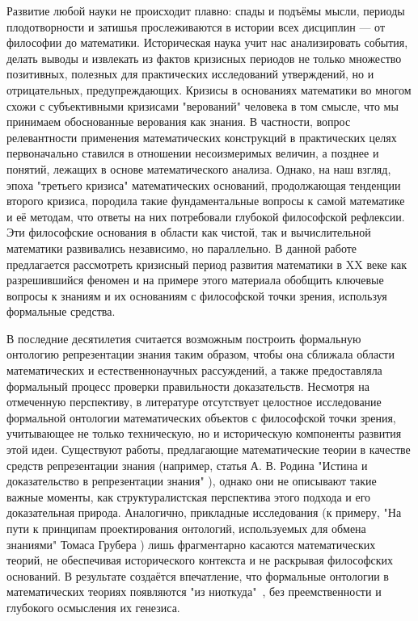 Развитие любой науки не происходит плавно: спады и подъёмы мысли, периоды плодотворности и затишья прослеживаются в истории всех дисциплин — от философии до математики. Историческая наука учит нас анализировать события, делать выводы и извлекать из фактов кризисных периодов не только множество позитивных, полезных для практических исследований утверждений, но и отрицательных, предупреждающих. Кризисы в основаниях математики во многом схожи с субъективными кризисами "верований" человека в том смысле, что мы принимаем обоснованные верования как знания. В частности, вопрос релевантности применения математических конструкций в практических целях первоначально ставился в отношении несоизмеримых величин, а позднее и понятий, лежащих в основе математического анализа. Однако, на наш взгляд, эпоха "третьего кризиса" математических оснований, продолжающая тенденции второго кризиса, породила такие фундаментальные вопросы к самой математике и её методам, что ответы на них потребовали глубокой философской рефлексии. Эти философские основания в области как чистой, так и вычислительной математики развивались независимо, но параллельно. В данной работе предлагается рассмотреть кризисный период развития математики в XX веке как разрешившийся феномен и на примере этого материала обобщить ключевые вопросы к знаниям и их основаниям с философской точки зрения, используя формальные средства.
	
	В последние десятилетия считается возможным построить формальную онтологию репрезентации знания таким образом, чтобы она сближала области математических и естественнонаучных рассуждений, а также предоставляла формальный процесс проверки правильности доказательств. Несмотря на отмеченную перспективу, в литературе отсутствует целостное исследование формальной онтологии математических объектов с философской точки зрения, учитывающее не только техническую, но и историческую компоненты развития этой идеи. Существуют работы, предлагающие математические теории в качестве средств репрезентации знания (например, статья А. В. Родина "Истина и доказательство в репрезентации знания" \cite{RodinKovalyov2025}), однако они не описывают такие важные моменты, как структуралистская перспектива этого подхода и его доказательная природа. Аналогично, прикладные исследования (к примеру, "На пути к принципам проектирования онтологий, используемых для обмена знаниями" Томаса Грубера \cite{Gruber1993}) лишь фрагментарно касаются математических теорий, не обеспечивая исторического контекста и не раскрывая философских оснований. В результате создаётся впечатление, что формальные онтологии в математических теориях появляются "из ниоткуда"\  , без преемственности и глубокого осмысления их генезиса.
	
